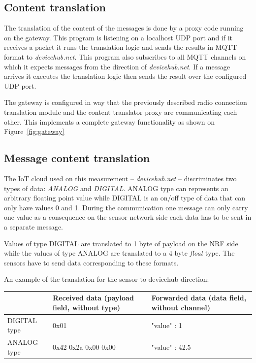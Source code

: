 \documentclass[a4paper]{article}
\begin{document}
\subsection{Content translation}

The translation of the content of the messages is done by a proxy code running on the gateway.
This program is listening on a localhost UDP port and if it receives a packet it runs the
translation logic and sends the results in MQTT format to \emph{devicehub.net}. This program
also subscribes to all MQTT channels on which it expects messages from the direction of \emph{devicehub.net}.
If a message arrives it executes the translation logic then sends the result over the 
configured UDP port.

The gateway is configured in way that the previously described radio connection translation 
module and the content translator proxy are communicating each other. This implements a complete
gateway functionality as shown on Figure~\ref{fig:gateway}

\subsection{Message content translation}

The IoT cloud used on this measurement -- \emph{devicehub.net} -- discriminates two types of 
data: \emph{ANALOG} and \emph{DIGITAL}. ANALOG type can represents an arbitrary floating point
value while DIGITAL is an on/off type of data that can only have values 0 and 1.
During the communication one message can only carry one value as a consequence on the sensor
network side each data has to be sent in a separate message.

Values of type DIGITAL are translated to 1 byte of payload on the NRF side while the values
of type ANALOG are translated to a 4 byte \emph{float} type. The sensors have to send data
corresponding to these formats.

An example of the translation for the sensor to devicehub direction:


\begin{tabular}{| l | l | l |}
\hline
 & Received data (payload field, without type) & Forwarded data (data field, without channel) \\
 \hline
DIGITAL type & 0x01 & {"value" : 1} \\
\hline
ANALOG type & 0x42 0x2a 0x00 0x00 & {"value" : 42.5} \\
\hline
\end{tabular}
\end{document}
